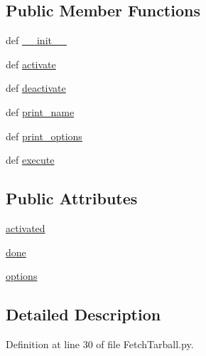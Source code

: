 \subsection*{Public Member Functions}
\begin{DoxyCompactItemize}
\item 
def \hyperlink{class_fetch_tarball_1_1_fetch_tarball_a0fb0f6decddbd019212beb941b1d8b33}{\-\_\-\-\_\-init\-\_\-\-\_\-}
\item 
def \hyperlink{class_fetch_tarball_1_1_fetch_tarball_a9a88f8be0e5f6c54247c3a85da711f38}{activate}
\item 
def \hyperlink{class_fetch_tarball_1_1_fetch_tarball_aba185f1c1adad0aea744fc418093ffcf}{deactivate}
\item 
def \hyperlink{class_fetch_tarball_1_1_fetch_tarball_afcac4e7b528550c345ffca891b0f32fa}{print\-\_\-name}
\item 
def \hyperlink{class_fetch_tarball_1_1_fetch_tarball_a750d4f069ce00c62d8e44d1e5dd47d08}{print\-\_\-options}
\item 
def \hyperlink{class_fetch_tarball_1_1_fetch_tarball_ad99192c36d2f7200799fa8a2a37c6a5a}{execute}
\end{DoxyCompactItemize}
\subsection*{Public Attributes}
\begin{DoxyCompactItemize}
\item 
\hyperlink{class_fetch_tarball_1_1_fetch_tarball_a4e6818fd64191913c3f302485c2c4e96}{activated}
\item 
\hyperlink{class_fetch_tarball_1_1_fetch_tarball_ae733fd553804854c3beef59df1739732}{done}
\item 
\hyperlink{class_fetch_tarball_1_1_fetch_tarball_ae5c7611a1ef415c3e38c75ea803ef2e3}{options}
\end{DoxyCompactItemize}


\subsection{Detailed Description}


Definition at line 30 of file Fetch\-Tarball.\-py.



